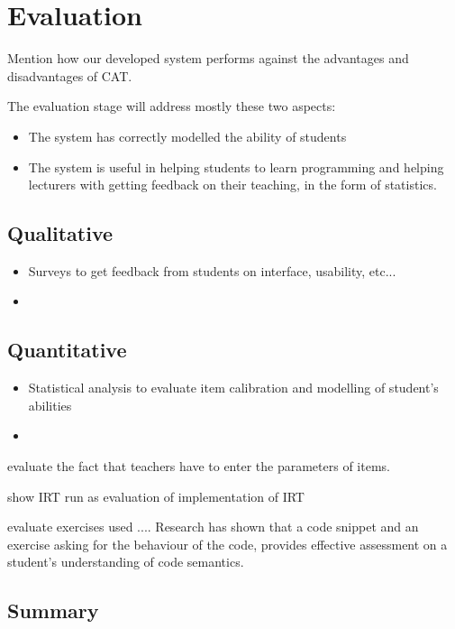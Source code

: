 \chapter{Evaluation}
\label{chap:evaluation}
Mention how our developed system performs against the advantages and disadvantages of CAT.

The evaluation stage will address mostly these two aspects:
\begin{itemize}
\item The system has correctly modelled the ability of students
\item The system is useful in helping students to learn programming and helping lecturers with getting feedback on their teaching, in the form of statistics.
\end{itemize}

\section{Qualitative}
\begin{itemize}
\item Surveys to get feedback from students on interface, usability, etc...
\item 
\end{itemize}

\section{Quantitative}
\begin{itemize}
\item Statistical analysis to evaluate item calibration and modelling of student's abilities
\item 
\end{itemize}

evaluate the fact that teachers have to enter the parameters of items.

show IRT run as evaluation of implementation of IRT

evaluate exercises used .... Research\cite{Lister} has shown that a code snippet and an exercise asking for the behaviour of the code, provides effective assessment on a student's understanding of code semantics.

\section{Summary}